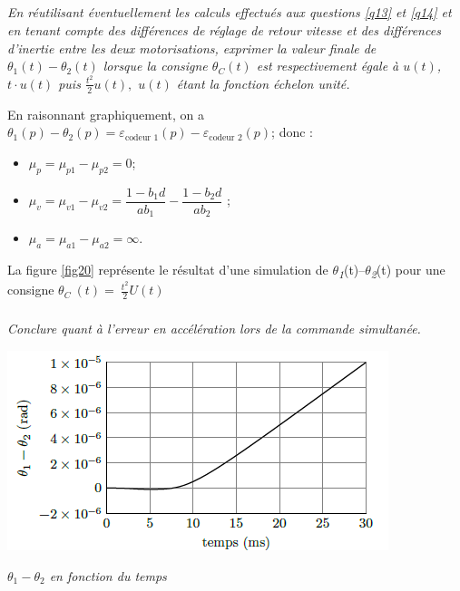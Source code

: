 \documentclass[10pt,fleqn]{article} %
\begin{document}
\begin{multicols}{2}
\subparagraph{}\textit{En réutilisant éventuellement les calculs effectués aux questions \ref{q13} et \ref{q14} et en
  tenant compte des différences de réglage de retour vitesse et des
  différences d'inertie entre les deux motorisations, exprimer la valeur
  finale de $\theta_1(t)-\theta_2(t)$ lorsque la consigne $\theta_C(t)$ est respectivement
  égale à $u(t)$, $t\cdot u(t)$ puis \(\frac{t^{2}}{2}u(t),\) $u(t)$ étant la
  fonction échelon unité.}
\ifprof
\begin{corrige}
En raisonnant graphiquement, on a $\theta_1(p)- \theta_2(p)=\varepsilon_{\text{codeur 1}}(p)- \varepsilon_{\text{codeur 2}}(p)$; donc : 
\begin{itemize}
\item $\mu_p = \mu_{p1}-\mu_{p2} = 0$;
\item $\mu_v = \mu_{v1}-\mu_{v2} = \dfrac{1-b_1d}{ab_1}-\dfrac{1-b_2d}{ab_2} $ ;
\item $\mu_a = \mu_{a1}-\mu_{a2} = \infty$.
\end{itemize}
\end{corrige}
\else
\fi

La figure \ref{fig20} représente le résultat d'une simulation de
$\theta$\emph{\textsubscript{1}}(t)--$\theta$\emph{\textsubscript{2}}(t) pour une
consigne \(\theta_{C}\ \left( t \right) = \ \frac{t^{2}}{2}U(t)\)

\subparagraph{}\textit{Conclure quant à l'erreur en accélération lors de la commande
  simultanée.}
\ifprof
\begin{corrige}
\end{corrige}
\else
\fi


\begin{center}
\includegraphics[width=\linewidth]{images/image21.png}

\textit{$\theta_1-\theta_2$ en
fonction du temps \label{fig20}}
\end{center}



\end{multicols}
\end{document}
